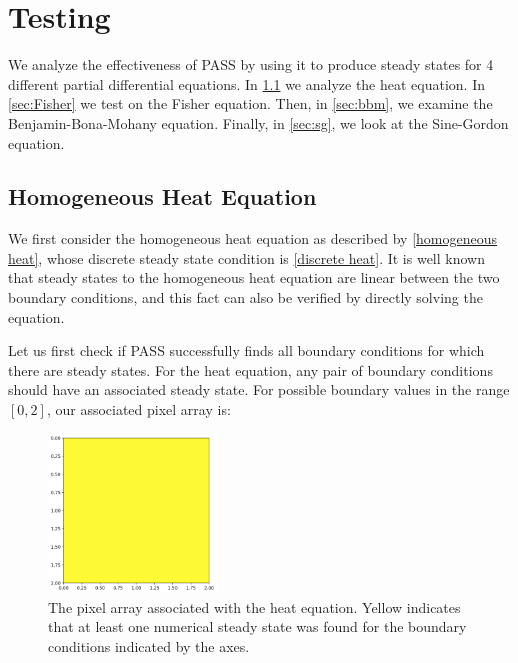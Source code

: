 \documentclass[11pt]{article}
\begin{document}
\section{Testing}\label{sec:testing}

We analyze the effectiveness of PASS by using it to produce steady states for 4 different partial differential equations. In \cref{sec:homog_heat} we analyze the heat equation. In \cref{sec:Fisher} we test on the Fisher equation. Then, in \cref{sec:bbm}, we examine the Benjamin-Bona-Mohany equation. Finally, in \cref{sec:sg}, we look at the Sine-Gordon equation.

\subsection{Homogeneous Heat Equation}\label{sec:homog_heat}

We first consider the homogeneous heat equation as described by \cref{homogeneous heat}, whose discrete steady state condition is \cref{discrete heat}. It is well known that steady states to the homogeneous heat equation are linear between the two boundary conditions, and this fact can also be verified by directly solving the equation. 

Let us first check if PASS successfully finds all boundary conditions for which there are steady states. For the heat equation, any pair of boundary conditions should have an associated steady state. For possible boundary values in the range $[0,2]$, our associated pixel array is:

\begin{figure}[h]
\centering
\includegraphics[width=4.5cm]{images/heatGood.png}
\caption{The pixel array associated with the heat equation. Yellow indicates that at least one numerical steady state was found for the boundary conditions indicated by the axes.}
\label{heatPixel}
\end{figure}
\end{document}
